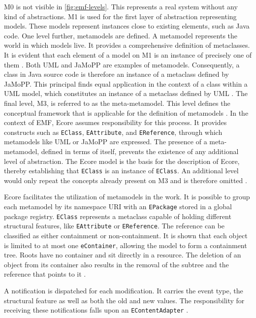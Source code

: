 M0 is not visible in \autoref{fig:emf-levels}.
This represents a real system without any kind of abstractions.
M1 is used for the first layer of abstraction representing models.
These models represent instances close to existing elements, such as Java code.
One level further, metamodels are defined.
A metamodel represents the world in which models live.
It provides a comprehensive definition of metaclasses.
It is evident that each element of a model on M1 is an instance of precisely one of them \cite{kuhne2006matters}.
Both UML and JaMoPP are examples of metamodels.
Consequently, a class in Java source code is therefore an instance of a metaclass defined by JaMoPP.
This principal finds equal application in the context of a class within a UML model, which constitutes an instance of a metaclass defined by UML \cite{heidenreich2009closing,bezivin2005bridging}.
The final level, M3, is referred to as the meta-metamodel.
This level defines the conceptual framework that is applicable for the definition of metamodels \cite{omgMof}.
In the context of EMF, Ecore assumes responsibility for this process.
It provides constructs such as \texttt{EClass}, \texttt{EAttribute}, and \texttt{EReference}, through which metamodels like UML or JaMoPP are expressed.
The presence of a meta-metamodel, defined in terms of itself, prevents the existence of any additional level of abstraction.
The Ecore model is the basis for the description of Ecore, thereby establishing that \texttt{EClass} is an instance of \texttt{EClass}.
An additional level would only repeat the concepts already present on M3 and is therefore omitted \cite{emfDocs,omgMof}.

Ecore facilitates the utilization of metamodels in the work.
It is possible to group each metamodel by its namespace URI with an \texttt{EPackage} stored in a global package registry.
\texttt{EClass} represents a metaclass capable of holding different structural features, like \texttt{EAttribute} or \texttt{EReference}.
The reference can be classified as either containment or non-containment.
It is shown that each object is limited to at most one \texttt{eContainer}, allowing the model to form a containment tree.
Roots have no container and sit directly in a resource.
The deletion of an object from its container also results in the removal of the subtree and the reference that points to it \cite{emfDocs}.

A notification is dispatched for each modification.
It carries the event type, the structural feature as well as both the old and new values.
The responsibility for receiving these notifications falls upon an \texttt{EContentAdapter} \cite{emfDocs}.

